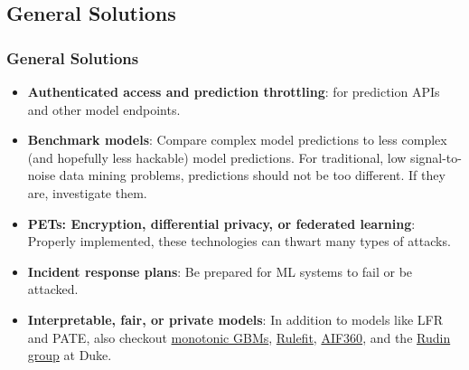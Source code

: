 \documentclass[11pt,
               aspectratio=169,
               hyperref={colorlinks}
               ]{beamer}
\begin{document}
		\subsection{General Solutions}
	
			\begin{frame}[t]	
		
				\frametitle{General Solutions}	
				\scriptsize
				\small
				\begin{itemize}
					\item \textbf{Authenticated access and prediction throttling}: for prediction APIs and other model endpoints.
					\item \textbf{Benchmark models}: Compare complex model predictions to less complex (and hopefully less hackable) model predictions. For traditional, low signal-to-noise data mining problems, predictions should not be too different. If they are, investigate them.
					\item \textbf{PETs: Encryption, differential privacy, or federated learning}: Properly implemented, these technologies can thwart many types of attacks.
					\item \textbf{Incident response plans}: Be prepared for ML systems to fail or be attacked.
					\item \textbf{Interpretable, fair, or private models}: In addition to models like LFR and PATE, also checkout \href{https://github.com/h2oai/h2o-3/blob/master/h2o-py/demos/H2O_tutorial_gbm_monotonicity.ipynb}{monotonic GBMs}, \href{https://christophm.github.io/interpretable-ml-book/rulefit.html}{Rulefit}, \href{https://github.com/IBM/AIF360}{AIF360}, and the \href{https://users.cs.duke.edu/~cynthia/code.html}{Rudin group} at Duke.
				\end{itemize}
			\end{frame}
			
\end{document}
